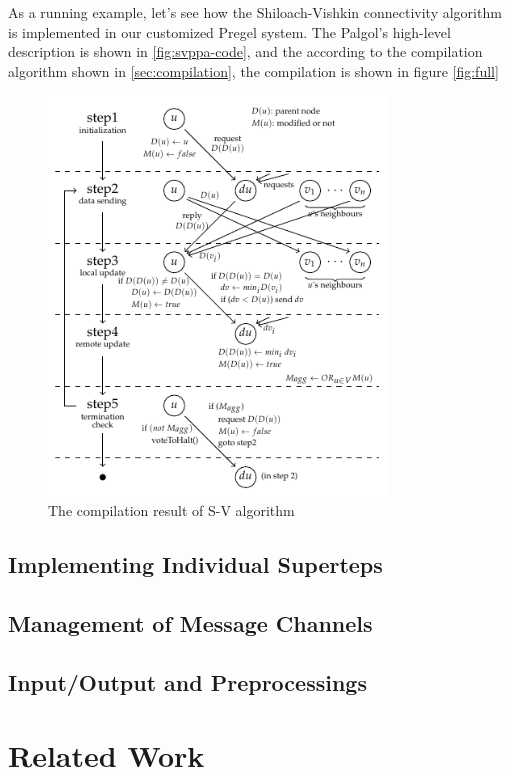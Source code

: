 \documentclass{sokendai_thesis} %
\begin{document}
As a running example, let's see how the Shiloach-Vishkin connectivity algorithm~\cite{connectivity} is implemented in our customized Pregel system.
The Palgol's high-level description is shown in \autoref{fig:svppa-code}, and the according to the compilation algorithm shown in \autoref{sec:compilation}, the compilation is shown in figure \autoref{fig:full}

\begin{figure}[th]
 \centering
 \includegraphics[width=0.8\textwidth]{figures/full.pdf}
 \caption{The compilation result of S-V algorithm}
 \label{fig:full}
\end{figure}

\subsection{Implementing Individual Superteps}

\subsection{Management of Message Channels}

\subsection{Input/Output and Preprocessings}

\section{Related Work}
\end{document}
